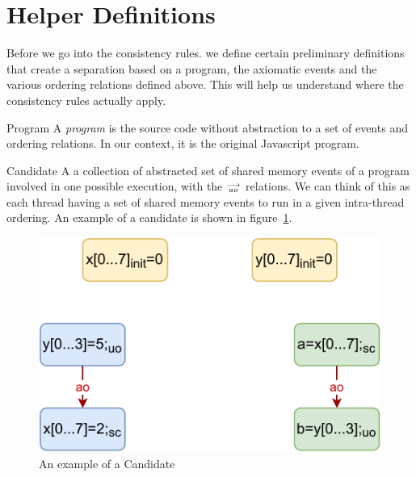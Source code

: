 \section{Helper Definitions}
    
    Before we go into the consistency rules. we define certain preliminary definitions that create a separation based on a program, the axiomatic events and the various ordering relations defined above. This will help us understand where the consistency rules actually apply.    
    
    \begin{definition}{Program} 
        A \emph{program} is the source code without abstraction to a set of events and ordering relations. In our context, it is the original Javascript program. 
        
    \end{definition}
    
    \begin{definition}{Candidate}
        A a collection of abstracted set of shared memory events of a program involved in one possible execution, with the $\stackrel{\longrightarrow}{_\textit{ao}}$ relations. We can think of this as each thread having a set of shared memory events to run in a given intra-thread ordering. An example of a candidate is shown in figure~\ref{fig:candidate}.
        
        \begin{figure}[H]
            \centering
            \includegraphics[scale=0.7]{ECMAScriptMemoryModel/candidate.pdf}
            \caption{An example of a Candidate}
            \label{fig:candidate}
        \end{figure}
        
    \end{definition}

